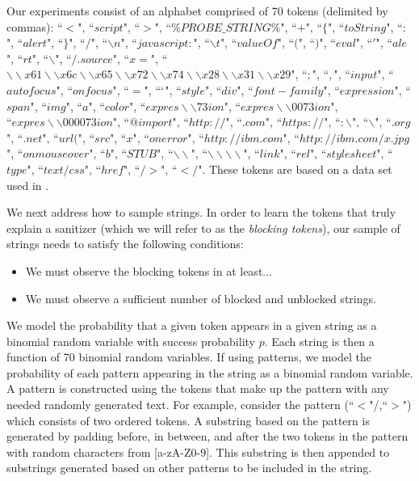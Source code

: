 Our experiments consist of an alphabet comprised of 70 tokens (delimited by commas): ``$<$", ``$script$", ``$>$", ``$\%PROBE\_STRING\%$", ``$+$", ``$\{$", ``$toString$", ``$:$", ``$alert$", ``$\}$", ``$/$", ``$\backslash n$", ``$javascript:$", ``$\backslash t$", ``$valueOf$", ``$($", ``$)$", ``$eval$", ``$'$", ``$ale$", ``$rt$", ``$\backslash $", ``$/.source$", ``$x=$", ``$\backslash \backslash x61\backslash \backslash x6c\backslash \backslash x65\backslash \backslash x72\backslash \backslash x74\backslash \backslash x28\backslash \backslash x31\backslash \backslash x29$", ``$;$", ``$,$", ``$input$", ``$autofocus$", ``$onfocus$", ``$=$", ``$`$", ``$style$", ``$div$", ``$font-family$", ``$expression$", ``$span$", ``$img$", ``$a$", ``$color$", ``$expres\backslash \backslash 73ion$", ``$expres\backslash \backslash 0073ion$", \\``$expres\backslash \backslash 000073ion$", ``$@import$", ``$http://$", ``$.com$", ``$https://$", ``$:\backslash $", ``$\backslash $", ``$.org$", ``$.net$", ``$url($", ``$src$", ``$x$", ``$onerror$", ``$http://ibm.com$", ``$http://ibm.com/x.jpg$", ``$onmouseover$", ``$b$", ``$STUB$", ``$\backslash \backslash $", ``$\backslash \backslash \backslash \backslash $", ``$link$", ``$rel$", ``$stylesheet$", ``$type$", ``$text/css$", ``$href$", ``$/>$", ``$</$". These tokens are based on a data set used in \cite{Tripp2013}.

We next address how to sample strings. In order to learn the tokens that truly explain a sanitizer (which we will refer to as the \emph{blocking tokens}), our sample of strings needs to satisfy the following conditions: 
\begin{itemize}
	\item We must observe the blocking tokens in at least...
	\item We must observe a sufficient number of blocked and unblocked strings. 	
\end{itemize} 
We model the probability that a given token appears in a given string as a binomial random variable with success probability $p$. Each string is then a function of 70 binomial random variables. If using patterns, we model the probability of each pattern appearing in the string as a binomial random variable. A pattern is constructed using the tokens that make up the pattern with any needed randomly generated text.  For example, consider the pattern (``$<$"/,``$>$") which consists of two ordered tokens. A substring based on the pattern is generated by padding before, in between, and after the two tokens in the pattern with random characters from [a-zA-Z0-9]. This substring is then appended to substrings generated based on other patterns to be included in the string. 

